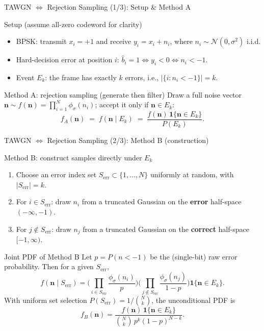 \begin{frame}{TAWGN $\Leftrightarrow$ Rejection Sampling (1/3): Setup \& Method A}
\vspace{-0.15cm}
\begin{block}{Setup (assume all-zero codeword for clarity)}
\vspace{-0.1cm}
\begin{itemize}
  \item BPSK: transmit $x_i=+1$ and receive $y_i=x_i+n_i$, where $n_i\sim\mathcal{N}(0,\sigma^2)$ i.i.d.
  \item Hard-decision error at position $i$: $\hat b_i=1 \iff y_i<0 \iff n_i<-1$.
  \item Event $E_k$: the frame has exactly $k$ errors, i.e., $\left|\{i: n_i<-1\}\right|=k$.
\end{itemize}
\end{block}

\begin{block}{Method A: rejection sampling (generate then filter)}
\vspace{-0.1cm}
Draw a full noise vector $\bm{n}\sim f(\bm{n})=\prod_{i=1}^{N}\phi_\sigma(n_i)$; accept it only if $\bm{n}\in E_k$:
\[
f_A(\bm{n}) \;=\; f(\bm{n}\mid E_k)
 \;=\; \frac{f(\bm{n})\,\mathbf{1}\{\bm{n}\in E_k\}}{P(E_k)}.
\]
\end{block}
\end{frame}

\begin{frame}{TAWGN $\Leftrightarrow$ Rejection Sampling (2/3): Method B (construction)}
\vspace{-0.15cm}
\begin{block}{Method B: construct samples directly under $E_k$}
\vspace{-0.1cm}
\begin{enumerate}
  \item Choose an error index set $S_{\text{err}}\subset\{1,\dots,N\}$ uniformly at random, with $|S_{\text{err}}|=k$.
  \item For $i\in S_{\text{err}}$: draw $n_i$ from a truncated Gaussian on the \textbf{error} half-space $(-\infty,-1)$.
  \item For $j\notin S_{\text{err}}$: draw $n_j$ from a truncated Gaussian on the \textbf{correct} half-space $[-1,\infty)$.
\end{enumerate}
\end{block}

\begin{block}{Joint PDF of Method B}
\vspace{-0.1cm}
Let $p=P(n<-1)$ be the (single-bit) raw error probability. Then for a given $S_{\text{err}}$,
\[
f(\bm{n}\mid S_{\text{err}})
=
\Big(\prod_{i\in S_{\text{err}}}\frac{\phi_\sigma(n_i)}{p}\Big)
\Big(\prod_{j\notin S_{\text{err}}}\frac{\phi_\sigma(n_j)}{1-p}\Big)
\mathbf{1}\{\bm{n}\in E_k\}.
\]
With uniform set selection $P(S_{\text{err}})=1/\binom{N}{k}$, the unconditional PDF is
\[
f_B(\bm{n})
=
\frac{f(\bm{n})\,\mathbf{1}\{\bm{n}\in E_k\}}
{\binom{N}{k}\,p^k(1-p)^{N-k}}.
\]
\end{block}
\end{frame}

